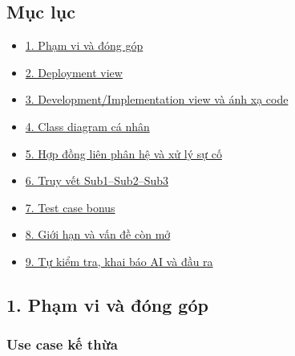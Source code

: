 \documentclass[11pt,a4paper]{article}
\providecommand{\tightlist}{%
  \setlength{\itemsep}{0pt}\setlength{\parskip}{0pt}}
\begin{document}
\hypertarget{mux1ee5c-lux1ee5c}{%
\subsection{Mục lục}\label{mux1ee5c-lux1ee5c}}

\begin{itemize}
\tightlist
\item
  \protect\hyperlink{1-pham-vi-va-ong-gop}{1. Phạm vi và đóng góp}
\item
  \protect\hyperlink{2-deployment-view}{2. Deployment view}
\item
  \protect\hyperlink{3-developmentimplementation-view-va-anh-xa-code}{3.
  Development/Implementation view và ánh xạ code}
\item
  \protect\hyperlink{4-class-diagram-ca-nhan}{4. Class diagram cá nhân}
\item
  \protect\hyperlink{5-hop-ong-lien-phan-he-va-xu-ly-su-co}{5. Hợp đồng
  liên phân hệ và xử lý sự cố}
\item
  \protect\hyperlink{6-truy-vet-sub1sub2sub3}{6. Truy vết
  Sub1--Sub2--Sub3}
\item
  \protect\hyperlink{7-test-case-bonus}{7. Test case bonus}
\item
  \protect\hyperlink{8-gioi-han-va-van-e-con-mo}{8. Giới hạn và vấn đề
  còn mở}
\item
  \protect\hyperlink{9-tu-kiem-tra-khai-bao-ai-va-au-ra}{9. Tự kiểm tra,
  khai báo AI và đầu ra}
\end{itemize}

\hypertarget{phux1ea1m-vi-vuxe0-ux111uxf3ng-guxf3p}{%
\subsection{1. Phạm vi và đóng
góp}\label{phux1ea1m-vi-vuxe0-ux111uxf3ng-guxf3p}}

\hypertarget{use-case-kux1ebf-thux1eeba}{%
\subsubsection{Use case kế thừa}\label{use-case-kux1ebf-thux1eeba}}
\end{document}
